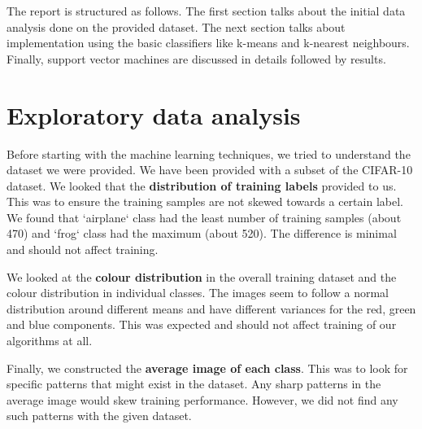 \documentclass{article} %
\begin{document}
The report is structured as follows. The first section talks about the initial data analysis done on the provided dataset. The next section talks about implementation using the basic classifiers like k-means and k-nearest neighbours. Finally, support vector machines are discussed in details followed by results.

\section{Exploratory data analysis}
    Before starting with the machine learning techniques, we tried to understand the dataset we were provided. We have been provided with a subset of the CIFAR-10 dataset. We looked that the \textbf{distribution of training labels} provided to us. This was to ensure the training samples are not skewed towards a certain label. We found that `airplane` class had the least number of training samples (about 470) and `frog` class had the maximum (about 520). The difference is minimal and should not affect training.

    We looked at the \textbf{colour distribution} in the overall training dataset and the colour distribution in individual classes. The images seem to follow a normal distribution around different means and have different variances for the red, green and blue components. This was expected and should not affect training of our algorithms at all.

    Finally, we constructed the \textbf{average image of each class}. This was to look for specific patterns that might exist in the dataset. Any sharp patterns in the average image would skew training performance. However, we did not find any such patterns with the given dataset.
\end{document}
